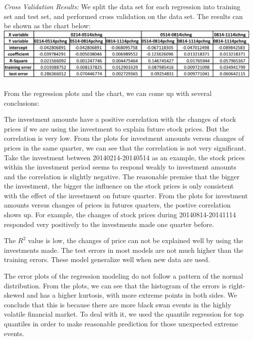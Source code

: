 \documentclass{article}
\begin{document}
\begin{multicols}{2}
\textit{Cross Validation Results:}
We split the data set for each regression into training set and test set, and performed cross validation on the data set. The results can be shown as the chart below:
\includegraphics[scale=.44]{logregression.png}\\ \\
From the regression plots and the chart, we can come up with several conclusions:

The investment amounts have a positive correlation with the changes of stock prices if we are using the investment to explain future stock prices. But the correlation is very low. From the plots for investment amounts versus changes of prices in the same quarter, we can see that the correlation is not very significant. Take the investment between 20140214-20140514 as an example, the stock prices within the investment period seems to respond weakly to investment amounts and the correlation is slightly negative. The reasonable premise that the bigger the investment, the bigger the influence on the stock prices is only consistent with the effect of the investment on future quarter. From the plots for investment amounts versus changes of prices in futures quarters, the postive correlation shows up. For example, the changes of stock prices during 20140814-20141114 responded very positively to the investments made one quarter before.

The $R^{2}$ value is low, the changes of price can not be explained well by using the investments made. The test errors in most models are not much higher than the training errors. These model generalize well when new data are used.

The error plots of the regression modeling do not follow a pattern of the normal distribution. From the plots, we can see that the histogram of the errors is right-skewed and has a higher kurtosis, with more extreme points in both sides. We conclude that this is because there are more black swan events in the highly volatile financial market. To deal with it, we used the quantile regression for top quantiles in order to make reasonable prediction for those unexpected extreme events. 



\end{multicols}
\end{document}
